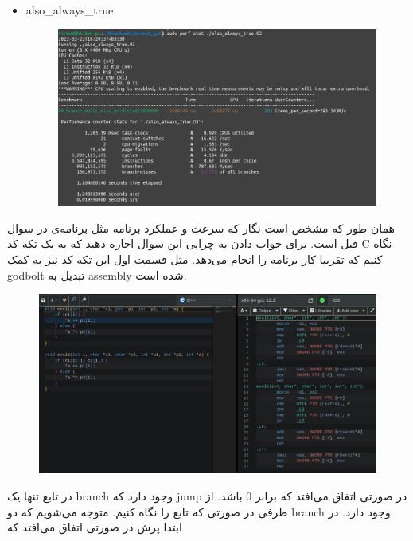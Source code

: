 \begin{enumerate}
\begin{latin}
\begin{itemize}
\begin{figure}[H]
        \end{figure}
        \item also\_always\_true
        \begin{figure}[H]
            \centerline{\includegraphics[scale=0.35]{pics/5/C/also_always_true.png}}
        \end{figure}
    \end{itemize}
    \end{latin}
    همان طور که مشخص است نگار که سرعت و عملکرد برنامه مثل برنامه‌ی
    در سوال قبل است. برای جواب دادن به چرایی این سوال اجازه دهید که به یک تکه کد
    C
    نگاه کنیم که تقریبا کار برنامه را انجام می‌دهد. مثل قسمت اول این تکه کد نیز به کمک godbolt
    تبدیل به assembly 
    شده است.
    \begin{figure}[H]
        \centerline{\includegraphics[scale=0.35]{pics/5/C/godbolt.png}}
    \end{figure}
    در تابع 
    تنها یک branch
    وجود دارد که jump
    در صورتی اتفاق می‌افتد که
    برابر 0 باشد. از طرفی در صورتی که تابع
    را نگاه کنیم. متوجه می‌شویم که دو branch وجود دارد.
    در ابتدا پرش در صورتی اتفاق می‌افتد که

\end{enumerate}
